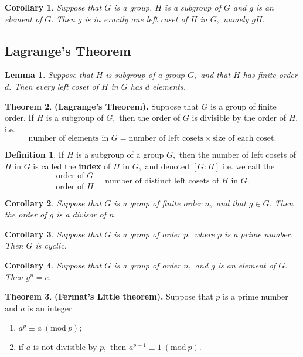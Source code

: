 \documentclass[12pt, a4paper]{article}
\newcommand{\Mod}[1]{\ (\mathrm{mod}\ #1)}
\theoremstyle{definition}
\newtheorem{definition}{Definition}[section]
\newtheorem{theorem}{Theorem}[section]
\theoremstyle{plain}
\newtheorem{corollary}{Corollary}[theorem]
\newtheorem{lemma}[theorem]{Lemma}
\begin{document}
\begin{corollary}
Suppose that $G$ is a group, $H$ is a subgroup of $G$ and $g$ is an element of $G.$ Then $g$ is in exactly one left coset of $H$ in $G,$ namely $gH.$
\end{corollary}

\subsection{Lagrange's Theorem}

\begin{lemma}
Suppose that $H$ is subgroup of a group $G,$ and that $H$ has finite order $d.$ Then every left coset of $H$ in $G$ has $d$ elements.
\end{lemma}

\begin{theorem}\textbf{(Lagrange's Theorem).}
Suppose that $G$ is a group of finite order. If $H$ is a subgroup of $G,$ then the order of $G$ is divisible by the order of $H.$ i.e. 
$$\text{number of elements in } G = \text{number of left cosets} \times \text{size of each coset}.$$
\end{theorem}

\begin{definition}
If $H$ is a subgroup of a group $G,$ then the number of left cosets of $H$ in $G$ is called the \textbf{index} of $H$  in $G,$ and denoted $[G:H]$ i.e. we call the $$\frac{\text{order of }G}{\text{order of }H}=\text{number of distinct left cosets of } H \text{ in } G.$$
\end{definition}

\begin{corollary}
Suppose that $G$ is a group of finite order $n,$ and that
$g \in G.$ Then the order of $g$ is a divisor of $n.$
\end{corollary}

\begin{corollary}
Suppose that $G$ is a group of order $p,$ where $p$ is a prime number. Then $G$ is cyclic.
\end{corollary}

\begin{corollary}
Suppose that $G$ is a group of order $n,$ and $g$ is an element of $G.$ Then $g^n =e.$
\end{corollary}

\begin{theorem}\textbf{(Fermat's Little theorem).}
Suppose that $p$ is a prime number and $a$ is an integer.
\begin{enumerate}
	
	\item $a^p \equiv a \Mod{p};$

	\item if $a$ is not divisible by $p,$ then $a^{p-1} \equiv 1 \Mod{p}.$

\end{enumerate}
\end{theorem}
\end{document}
